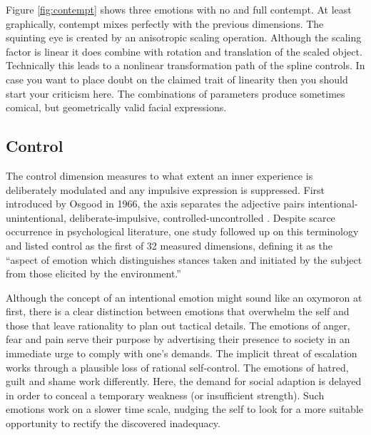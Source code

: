Figure \ref{fig:contempt} shows three emotions with no and full contempt. At least graphically,
contempt mixes perfectly with the previous dimensions.
The squinting eye is created by an anisotropic scaling operation. Although the scaling factor is
linear it does combine with rotation and translation of the scaled object. Technically this
leads to a nonlinear transformation path of the spline controls. In case you want to place
doubt on the claimed trait of linearity then you should start your criticism here.
The combinations of parameters produce sometimes comical, but geometrically valid facial expressions.


\subsection{Control}

The control dimension measures to what extent an inner experience is deliberately modulated
and any impulsive expression is suppressed. First introduced by Osgood in 1966, the
axis separates the adjective pairs intentional-unintentional, deliberate-impulsive,
controlled-uncontrolled \cite{control_osgood}. Despite scarce occurrence in psychological
literature, one study followed up on this terminology and
listed control as the first of 32 measured dimensions\cite{FRIJDA1969167}, defining it as the
``aspect of emotion which distinguishes stances
taken and initiated by the subject from those elicited by the environment.''

Although the concept of an intentional emotion might sound like an oxymoron at first,
there is a clear distinction between emotions that overwhelm the self and those that
leave rationality to plan out tactical details. The emotions of anger, fear and pain
serve their purpose by advertising their presence to society in an immediate urge to comply with
one's demands. The implicit threat of escalation works through a plausible loss of
rational self-control. The emotions of hatred, guilt and shame work differently.
Here, the demand for social adaption is delayed in order to conceal a temporary weakness (or insufficient strength).
Such emotions work on a slower time scale, nudging the self to look for a more suitable
opportunity to rectify the discovered inadequacy\cite{reed2014commitment,reed2014hatred,tracy2008shame}.

